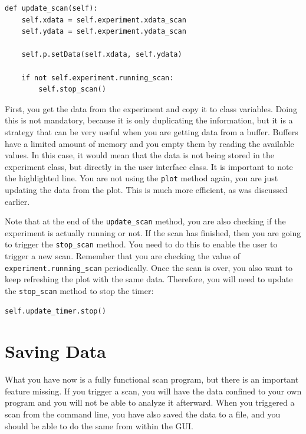 \begin{verbatim}
def update_scan(self):
    self.xdata = self.experiment.xdata_scan
    self.ydata = self.experiment.ydata_scan

    self.p.setData(self.xdata, self.ydata)

    if not self.experiment.running_scan:
        self.stop_scan()
\end{verbatim}

First, you get the data from the experiment and copy it to class
variables. Doing this is not mandatory, because it is only duplicating
the information, but it is a strategy that can be very useful when you
are getting data from a buffer. Buffers have a limited amount of memory
and you empty them by reading the available values. In this case, it
would mean that the data is not being stored in the experiment class,
but directly in the user interface class. It is important to note the
highlighted line. You are not using the \texttt{plot} method again, you
are just updating the data from the plot. This is much more efficient,
as was discussed earlier.


Note that at the end of the \texttt{update_scan} method, you are also
checking if the experiment is actually running or not. If the scan has
finished, then you are going to trigger the \texttt{stop_scan} method.
You need to do this to enable the user to trigger a new scan. Remember
that you are checking the value of \texttt{experiment.running_scan}
periodically. Once the scan is over, you also want to keep refreshing
the plot with the same data. Therefore, you will need to update the
\texttt{stop_scan} method to stop the timer:

\begin{verbatim}
self.update_timer.stop()
\end{verbatim}

\section{Saving Data}\label{savingdata}
What you have now is a fully functional scan program, but there is an
important feature missing. If you trigger a scan, you will have the data
confined to your own program and you will not be able to analyze it
afterward. When you triggered a scan from the command line, you have
also saved the data to a file, and you should be able to do the same
from within the {GUI}.

